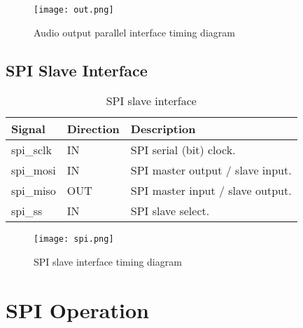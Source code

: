 \documentclass{rep}
\theoremstyle{plain}
\begin{document}
\begin{figure}[H]
  \begin{center}
    \texttt{[image: out.png]}
    \caption{Audio output parallel interface timing diagram}
    \label{fig:out}
  \end{center}
\end{figure}

\clearpage

      
\subsection{SPI Slave Interface}

\begin{table}[H]
  \begin{center}
    \begin{tabular}{|l|l|l|}
      \hline

      \rowcolor{iob-green}
      \textbf{Signal} & \textbf{Direction} & \textbf{Description} \\
      \hline
      \hline

      spi\_sclk & IN & SPI serial (bit) clock.\\ \hline

      \rowcolor{iob-blue} spi\_mosi & IN & SPI master output / slave
      input.\\ \hline

      spi\_miso & OUT & SPI master input / slave output.\\ \hline

      \rowcolor{iob-blue} spi\_ss & IN & SPI slave select. \\ \hline

    \end{tabular}
    \caption{SPI slave interface}
    \label{tab:spi}
  \end{center}
\end{table}

\begin{figure}[H]
  \begin{center}
    \texttt{[image: spi.png]}
    \caption{SPI slave interface timing diagram}
    \label{fig:spi}
  \end{center}
\end{figure}


\section{SPI Operation}
\label{sec:spi}
\end{document}
